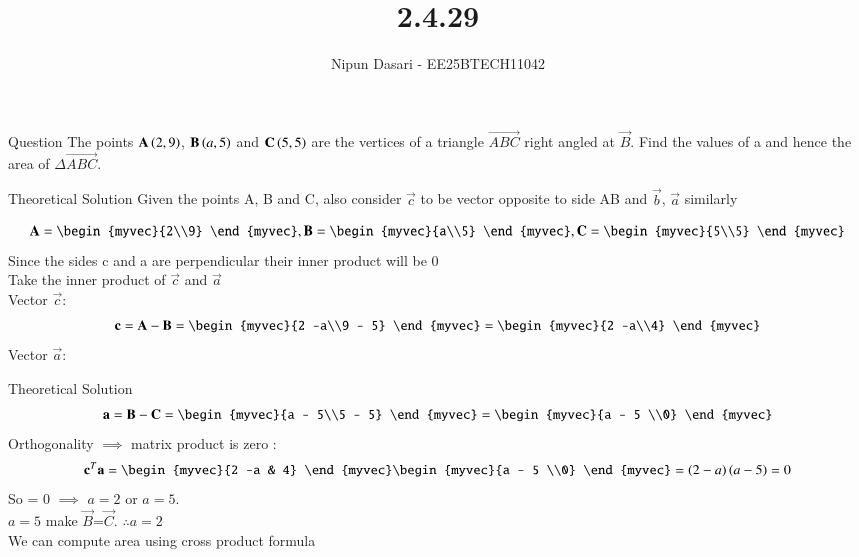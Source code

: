 \documentclass{beamer}
\title %
{2.4.29}
\author %
{Nipun Dasari - EE25BTECH11042}
\begin{document}
	
		\frame{\titlepage}
	\begin{frame}{Question}
	The points $\mathbf{A}\left(2, 9\right)$, $\mathbf{B}\left(a, 5\right)$ and $\mathbf{C}\left(5, 5\right)$ are the vertices of a triangle $\vec{ABC}$ right angled
	at $\vec{B}$. Find the values of a and hence the area of $\Delta\vec{ABC}$. \\
	\end{frame}

	
\begin{frame}{Theoretical Solution}
Given the points A, B and C, also consider $\vec{c}$ to be vector opposite to side AB and $\vec{b}$, $\vec{a}$ similarly

\begin{align}
	\vec{A} = \begin{myvec}{2\\9} \end{myvec} , \vec{B} = \begin{myvec}{a\\5} \end{myvec}, \vec{C} = \begin{myvec}{5\\5} \end{myvec}
\end{align}
Since the sides c and a are perpendicular their inner product will be 0\\
Take the inner product of $\vec{c}$ and $\vec{a}$\\
Vector $\vec{c}$:
\begin{align}
	\vec{c} = \vec{A}-\vec{B} = \begin{myvec}{2 -a\\9 - 5} \end{myvec} = \begin{myvec}{2 -a\\4} \end{myvec}
\end{align}
Vector $\vec{a}$:
\end{frame}
\begin{frame}{Theoretical Solution}
\begin{align}
	\vec{a} = \vec{B}-\vec{C} = \begin{myvec}{a - 5\\5 - 5} \end{myvec} = \begin{myvec}{a - 5 \\0} \end{myvec}
\end{align}
Orthogonality $\implies$ matrix product is zero :
\begin{align}
	\vec{c}^T\vec{a} = \begin{myvec}{2 -a & 4} \end{myvec}\begin{myvec}{a - 5 \\0} \end{myvec} = \brak{2-a}\brak{a-5} = 0
\end{align}
So  = 0 $\implies$ $a = 2$ or $a = 5$.\\
$a = 5$ make $\vec{B}$=$\vec{C}$. $\therefore a =2$  \\
We can compute area using cross product formula
\end{frame}
\end{document}
